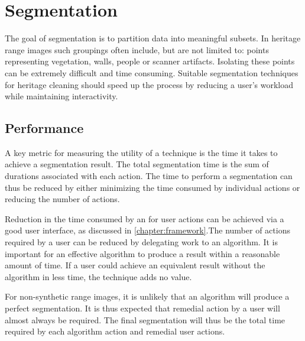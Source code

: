 \chapter{Segmentation}
The goal of segmentation is to partition data into meaningful subsets. In heritage range images such groupings often include, but are not limited to: points representing vegetation, walls, people or scanner artifacts. Isolating these points can be extremely difficult and time consuming. Suitable segmentation techniques for heritage cleaning should speed up the process by reducing a user's workload while maintaining interactivity.


\section{Performance}
A key metric for measuring the utility of a technique is the time it takes to achieve a segmentation result. The total segmentation time is the sum of durations associated with each action. The time to perform a segmentation can thus be reduced by either minimizing the time consumed by individual actions or reducing the number of actions.

Reduction in the time consumed by an for user actions can be achieved via a good user interface, as discussed in \ref{chapter:framework}.The number of actions required by a user can be reduced by delegating work to an algorithm. It is important for an effective algorithm to produce a result within a reasonable amount of time. If a user could achieve an equivalent result without the algorithm in less time, the technique adds no value.

For non-synthetic range images, it is unlikely that an algorithm will produce a perfect segmentation. It is thus expected that remedial action by a user will almost always be required. The final segmentation will thus be the total time required by each algorithm action and remedial user actions.

